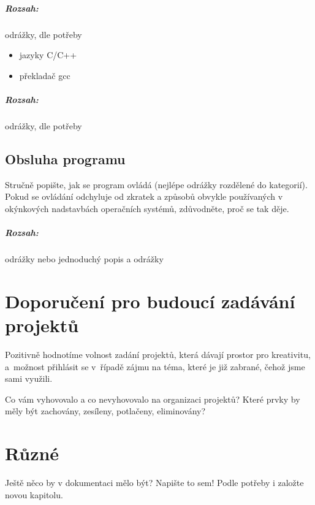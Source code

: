 \documentclass[12pt,a4paper,titlepage,final]{report}
\begin{document}
\paragraph{Rozsah:} odrážky, dle potřeby

\begin{itemize}
\item jazyky C/C++
\item překladač gcc
\end{itemize}

\paragraph{Rozsah:} odrážky, dle potřeby

\section{Obsluha programu}
Stručně popište, jak se program ovládá (nejlépe odrážky rozdělené do
kategorií). Pokud se ovládání odchyluje od zkratek a způsobů obvykle
používaných v okýnkových nadstavbách operačních systémů, zdůvodněte, proč se
tak děje.

\paragraph{Rozsah:} odrážky nebo jednoduchý popis a odrážky


\chapter{Doporučení pro budoucí zadávání projektů}

Pozitivně hodnotíme volnost zadání projektů, která dávají prostor pro
kreativitu, a~možnost přihlásit se v~řípadě zájmu na téma, které je již
zabrané, čehož jsme sami využili.

Co vám vyhovovalo a co nevyhovovalo na organizaci projektů? Které prvky by měly být zachovány, zesíleny, potlačeny, eliminovány?


\chapter{Různé}

Ještě něco by v dokumentaci mělo být? Napište to sem! Podle potřeby i založte
novou kapitolu.




\nocite{cite1}
\nocite{cite2}
\nocite{cite3}


\end{document}
